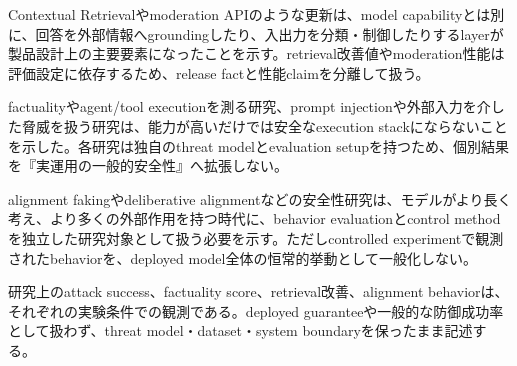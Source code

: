 
Contextual Retrievalやmoderation APIのような更新は、model capabilityとは別に、回答を外部情報へgroundingしたり、入出力を分類・制御したりするlayerが製品設計上の主要要素になったことを示す。retrieval改善値やmoderation性能は評価設定に依存するため、release factと性能claimを分離して扱う。\autocite{src-308d34e54e69,src-33d811167435}


factualityやagent/tool executionを測る研究、prompt injectionや外部入力を介した脅威を扱う研究は、能力が高いだけでは安全なexecution stackにならないことを示した。各研究は独自のthreat modelとevaluation setupを持つため、個別結果を『実運用の一般的安全性』へ拡張しない。\autocite{src-e7b786f4a622,src-f96e45232e1f}


alignment fakingやdeliberative alignmentなどの安全性研究は、モデルがより長く考え、より多くの外部作用を持つ時代に、behavior evaluationとcontrol methodを独立した研究対象として扱う必要を示す。ただしcontrolled experimentで観測されたbehaviorを、deployed model全体の恒常的挙動として一般化しない。\autocite{src-3278a129a17e,src-9cf289b414fd,src-e92e95daf8e0}


\begin{claimboundary}
研究上のattack success、factuality score、retrieval改善、alignment behaviorは、それぞれの実験条件での観測である。deployed guaranteeや一般的な防御成功率として扱わず、threat model・dataset・system boundaryを保ったまま記述する。\autocite{src-e7b786f4a622}
\end{claimboundary}
